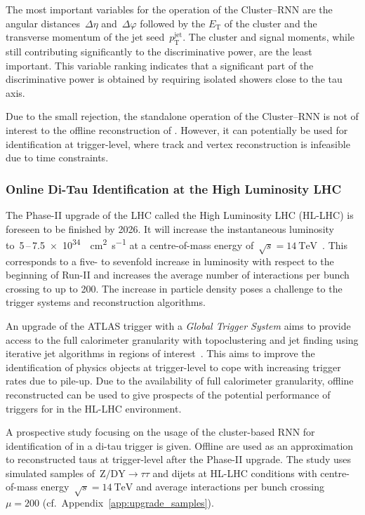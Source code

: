 The most important variables for the operation of the Cluster--RNN are the
angular distances~$\Delta \eta$ and~$\Delta \varphi$ followed by the
$E_\text{T}$ of the cluster and the transverse momentum of the jet
seed~$p_\text{T}^\text{jet}$. The cluster and signal moments, while still
contributing significantly to the discriminative power, are the least important.
This variable ranking indicates that a significant part of the discriminative
power is obtained by requiring isolated showers close to the tau axis.

Due to the small rejection, the standalone operation of the Cluster--RNN is not
of interest to the offline reconstruction of \tauhadvis. However, it can
potentially be used for \tauhadvis identification at trigger-level, where track
and vertex reconstruction is infeasible due to time constraints.

\subsubsection{Online Di-Tau Identification at the High Luminosity LHC}
\label{sec:hlt_rate_reduction}

The Phase-II upgrade of the LHC called the High Luminosity LHC (HL-LHC) is
foreseen to be finished by 2026. It will increase the instantaneous luminosity
to~\num{5}\,--\,\SI{7.5e34}{\per\square\centi\metre\per\second} at a
centre-of-mass energy
of~$\sqrt{s} = \SI{14}{\TeV}$~\cite{hl_lhc_prelim_design_report}. This
corresponds to a five- to sevenfold increase in luminosity with respect to the
beginning of Run-II and increases the average number of interactions per bunch
crossing to up to \num{200}. The increase in particle density poses a challenge
to the trigger systems and reconstruction algorithms.

An upgrade of the ATLAS trigger with a \emph{Global Trigger System} aims to
provide access to the full calorimeter granularity with topoclustering and jet
finding using iterative jet algorithms in regions of
interest~\cite{phase_2_scoping}. This aims to improve the identification of
physics objects at trigger-level to cope with increasing trigger rates due to
pile-up. Due to the availability of full calorimeter granularity, offline
reconstructed \tauhadvis can be used to give prospects of the potential
performance of triggers for \tauhadvis in the HL-LHC environment.

A prospective study focusing on the usage of the cluster-based RNN for
identification of \tauhadvis in a di-tau trigger is given. Offline \tauhadvis
are used as an approximation to reconstructed taus at trigger-level after the
Phase-II upgrade. The study uses simulated samples
of~$\text{Z} / \text{DY} \to \tau \tau$ and dijets at HL-LHC conditions with
centre-of-mass energy~$\sqrt{s}=\SI{14}{\TeV}$ and average interactions per
bunch crossing~$\mu = 200$ (cf.\ Appendix~\ref{app:upgrade_samples}).

